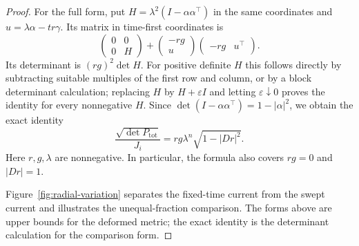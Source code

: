 \begin{proof}
For the full form, put $H=\lambda^2(I-\alpha\alpha^\top)$ in the
same coordinates and $u=\lambda\alpha-tr\gamma$.  Its matrix in
time-first coordinates is
\[
 \begin{pmatrix}0&0\\0&H\end{pmatrix}
 +\begin{pmatrix}-rg\\u\end{pmatrix}
  \begin{pmatrix}-rg&u^\top\end{pmatrix}.
\]
Its determinant is $(rg)^2\det H$.  For positive definite $H$ this
follows directly by subtracting suitable multiples of the first
row and column, or by a block determinant calculation; replacing
$H$ by $H+\varepsilon I$ and letting $\varepsilon\downarrow0$
proves the identity for every nonnegative $H$.  Since
$\det(I-\alpha\alpha^\top)=1-|\alpha|^2$, we obtain the exact
identity
\begin{equation}
 \frac{\sqrt{\det P_{\mathrm{tot}}}}{J_i}
 =rg\lambda^n\sqrt{1-|Dr|^2}.
 \label{eq:radial-total-jacobian}
\end{equation}
Here $r,g,\lambda$ are nonnegative.  In particular, the formula
also covers $rg=0$ and $|Dr|=1$.

Figure~\ref{fig:radial-variation} separates the fixed-time current
from the swept current and illustrates the unequal-fraction comparison.
The forms above are upper bounds for the deformed metric; the exact
identity is the determinant calculation for the comparison form.



\end{proof}

